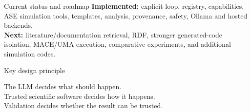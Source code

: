 \documentclass[aspectratio=169,11pt]{beamer}
\begin{document}
\begin{frame}{Current status and roadmap}
\textbf{Implemented:} explicit loop, registry, capabilities, ASE simulation tools,
templates, analysis, provenance, safety, Ollama and hosted backends.\\[0.5em]
\textbf{Next:} literature/documentation retrieval, RDF, stronger generated-code isolation,
MACE/UMA execution, comparative experiments, and additional simulation codes.
\end{frame}

\begin{frame}{Key design principle}
\begin{center}
\Large The LLM decides what should happen.\\[0.5em]
Trusted scientific software decides how it happens.\\[0.5em]
Validation decides whether the result can be trusted.
\end{center}
\end{frame}
\end{document}
